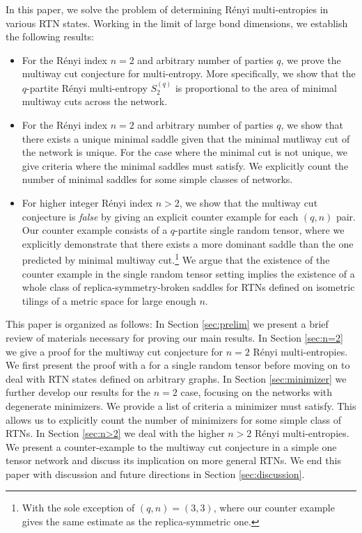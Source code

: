 \documentclass[11pt,oneside,letterpaper]{article}
\numberwithin{equation}{section}
\theoremstyle{definition}
\theoremstyle{remark}
\begin{document}
In this paper, we solve the problem of determining R\'enyi multi-entropies in various RTN states. Working in the limit of large bond dimensions, we establish the following results:
\begin{itemize}
\item For the R\'enyi index $n=2$ and arbitrary number of parties $q$, we prove the multiway cut conjecture for multi-entropy. More specifically, we show that the $q$-partite R\'enyi multi-entropy $S^{(q)}_2$ is proportional to the area of minimal multiway cuts across the network.

\item For the R\'enyi index $n=2$ and arbitrary number of parties $q$, we show that there exists a unique minimal saddle given that the minimal mutliway cut of the network is unique. For the case where the minimal cut is not unique, we give criteria where the minimal saddles must satisfy. We explicitly count the number of minimal saddles for some simple classes of networks.

\item For higher integer R\'enyi index $n>2$, we show that the multiway cut conjecture is \emph{false} by giving an explicit counter example for each $(q,n)$ pair. Our counter example consists of a $q$-partite single random tensor, where we explicitly demonstrate that there exists a more dominant saddle than the one predicted by minimal multiway cut.\footnote{With the sole exception of $(q,n)=(3,3)$, where our counter example gives the same estimate as the replica-symmetric one.} We argue that the existence of the counter example in the single random tensor setting implies the existence of a whole class of replica-symmetry-broken saddles for RTNs defined on isometric tilings of a metric space for large enough $n$.

\end{itemize}


This paper is organized as follows:
In Section \ref{sec:prelim} we present a brief review of materials necessary for proving our main results.
In Section \ref{sec:n=2} we give a proof for the multiway cut conjecture for $n=2$ R\'enyi multi-entropies. We first present the proof with a for  a single random tensor before moving on to deal with RTN states defined on arbitrary graphs.
In Section \ref{sec:minimizer} we further develop our results for the $n=2$ case, focusing on the networks with degenerate minimizers. We provide a list of criteria a minimizer must satisfy. This allows us to explicitly count the number of minimizers for some simple class of RTNs.
In Section \ref{sec:n>2} we deal with the higher $n>2$ R\'enyi multi-entropies. We present a counter-example to the multiway cut conjecture in a simple one tensor network and discuss its implication on more general RTNs.
We end this paper with discussion and future directions in Section \ref{sec:discussion}.
\end{document}
